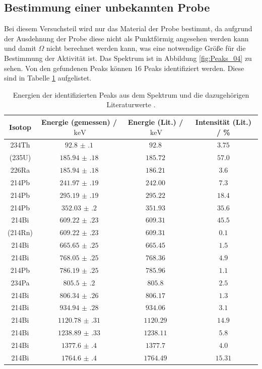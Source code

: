 \subsection{Bestimmung einer unbekannten Probe}
Bei diesem Versuchsteil wird nur  das Material der Probe bestimmt, da aufgrund der Ausdehnung der Probe diese nicht als Punktförmig 
angesehen werden kann und damit $\Omega$ nicht berechnet werden kann, was eine notwendige Größe für die Bestimmung der Aktivität ist.
Das Spektrum ist in Abbildung \ref{fig:Peaks_04} zu sehen.
Von den gefundenen Peaks können 16 Peaks identifiziert werden. Diese sind in Tabelle \ref{tab:ident_Peaks} 
aufgelistet.
\FloatBarrier
\begin{table}
  \centering
  \caption{Energien der identifizierten Peaks aus dem Spektrum und die dazugehörigen Literaturwerte \cite{Gamma_lit}.}
  \label{tab:ident_Peaks}
  \begin{tabular}{c c c c}
    \midrule
    Isotop& Energie (gemessen) / $\SI{}{\kilo\eV}$&  Energie (Lit.) / $\SI{}{\kilo\eV}$& Intensität (Lit.) / \%\\
    \midrule
    234Th&$\num{92.8(1)}$&$\num{92.8}$&$\num{3.75}$\\
    (235U)&$\num{185.94(18)}$&$\num{185.72}$&$\num{57.0}$\\
    226Ra&$\num{185.94(18)}$&$\num{186.21}$&$\num{3.6}$\\
    214Pb&$\num{241.97(19)}$&$\num{242.00}$&$\num{7.3}$\\
    214Pb&$\num{295.19(19)}$&$\num{295.22}$&$\num{18.4}$\\
    214Pb&$\num{352.03(20)}$&$\num{351.93}$&$\num{35.6}$\\
    214Bi&$\num{609.22(23)}$&$\num{609.31}$&$\num{45.5}$\\
    (214Rn)&$\num{609.22(23)}$&$\num{609.31}$&$\num{0.1}$\\
    214Bi&$\num{665.65(25)}$&$\num{665.45}$&$\num{1.5}$\\
    214Bi&$\num{768.05(25)}$&$\num{768.36}$&$\num{4.9}$\\
    214Pb&$\num{786.19(25)}$&$\num{785.96}$&$\num{1.1}$\\
    234Pa&$\num{805.5(2)}$&$\num{805.8}$&$\num{2.5}$\\
    214Bi&$\num{806.34(26)}$&$\num{806.17}$&$\num{1.3}$\\
    214Bi&$\num{934.94(28)}$&$\num{934.06}$&$\num{3.1}$\\
    214Bi&$\num{1120.78(31)}$&$\num{1120.29}$&$\num{14.9}$\\
    214Bi&$\num{1238.89(33)}$&$\num{1238.11}$&$\num{5.8}$\\
    214Bi&$\num{1377.6(4)}$&$\num{1377.7}$&$\num{4.0}$\\
    214Bi&$\num{1764.6(4)}$&$\num{1764.49}$&$\num{15.31}$\\
    \bottomrule
  \end{tabular}
\end{table}

